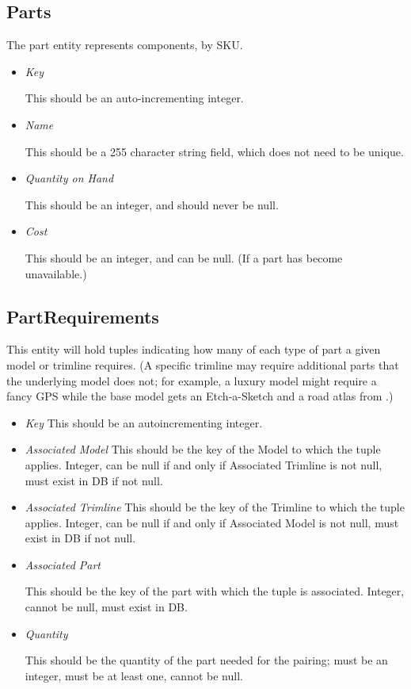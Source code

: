 \documentclass{article}
\begin{document}
\subsection*{Parts}

The part entity represents components, by SKU.

\begin{itemize}

\item \emph{Key}

	This should be an auto-incrementing integer.
	
\item \emph{Name}

	This should be a 255 character string field, which does not need to be unique.
	
\item \emph{Quantity on Hand}

	This should be an integer, and should never be null.
	
\item \emph{Cost}

	This should be an integer, and can be null. (If a part has become unavailable.)
	
\end{itemize}

\subsection*{PartRequirements}

This entity will hold tuples indicating how many of each type of part a given model or trimline requires.  (A specific trimline may require additional parts that the underlying model does not; for example, a luxury model might require a fancy GPS while the base model gets an Etch-a-Sketch and a road atlas from .)

\begin{itemize}

\item \emph{Key}
	This should be an autoincrementing integer.
	
\item \emph{Associated Model}
	This should be the key of the Model to which the tuple applies.  Integer, can be null if and only if Associated Trimline is not null, must exist in DB if not null.
	
\item \emph{Associated Trimline}
	This should be the key of the Trimline to which the tuple applies.  Integer, can be null if and only if Associated Model is not null, must exist in DB if not null.
	
\item \emph{Associated Part}

	This should be the key of the part with which the tuple is associated.  Integer, cannot be null, must exist in DB.
	
\item \emph{Quantity}

	This should be the quantity of the part needed for the pairing; must be an integer, must be at least one, cannot be null.
	
\end{itemize}
\end{document}
